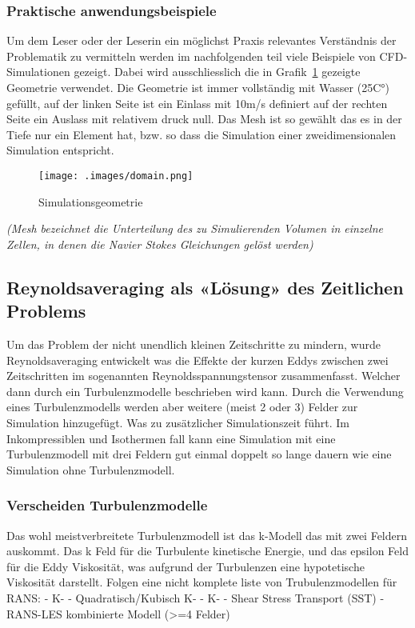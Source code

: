 \begin{refsection}
\subsubsection{Praktische anwendungsbeispiele}

Um dem Leser oder der Leserin ein möglichst Praxis relevantes Verständnis der Problematik zu vermitteln werden im nachfolgenden teil viele Beispiele von CFD-Simulationen gezeigt.
Dabei wird ausschliesslich die in Grafik~\ref{fig:SimDomain} gezeigte Geometrie verwendet.
Die Geometrie ist immer vollständig mit Wasser (25C°) gefüllt,
auf der linken Seite ist ein Einlass mit 10m/s definiert auf der rechten Seite ein Auslass mit relativem druck null.
Das Mesh ist so gewählt das es in der Tiefe nur ein Element hat, bzw. so dass die Simulation einer zweidimensionalen Simulation entspricht.

\begin{figure}
    \texttt{[image: .images/domain.png]}
    \caption{Simulationsgeometrie}
    \label{fig:SimDomain}
\end{figure}

\textit{(Mesh bezeichnet die Unterteilung des zu Simulierenden Volumen in einzelne Zellen, in denen die Navier Stokes Gleichungen gelöst werden)}

\subsection{Reynoldsaveraging als «Lösung» des Zeitlichen Problems}

Um das Problem der nicht unendlich kleinen Zeitschritte zu mindern, wurde Reynoldsaveraging entwickelt was die Effekte der kurzen Eddys zwischen zwei Zeitschritten im sogenannten Reynoldsspannungstensor zusammenfasst.
Welcher dann durch ein Turbulenzmodelle beschrieben wird kann.
Durch die Verwendung eines Turbulenzmodells werden aber weitere (meist 2 oder 3) Felder zur Simulation hinzugefügt. Was zu zusätzlicher Simulationszeit führt.
Im Inkompressiblen und Isothermen fall kann eine Simulation mit eine Turbulenzmodell mit drei Feldern gut einmal doppelt so lange dauern wie eine Simulation ohne Turbulenzmodell.

\subsubsection{Verscheiden Turbulenzmodelle}

Das wohl meistverbreitete Turbulenzmodell ist das k-\epsilon Modell das mit zwei Feldern auskommt. Das k Feld für die Turbulente kinetische Energie, und das epsilon Feld für die Eddy Viskosität, was aufgrund der Turbulenzen eine hypotetische Viskosität darstellt.
Folgen eine nicht komplete liste von Trubulenzmodellen für RANS:
-	K-\epsilon
-	Quadratisch/Kubisch K-\epsilon
-	K-\omega
-	Shear Stress Transport (SST)
-	RANS-LES kombinierte Modell (>=4 Felder)


\end{refsection}

